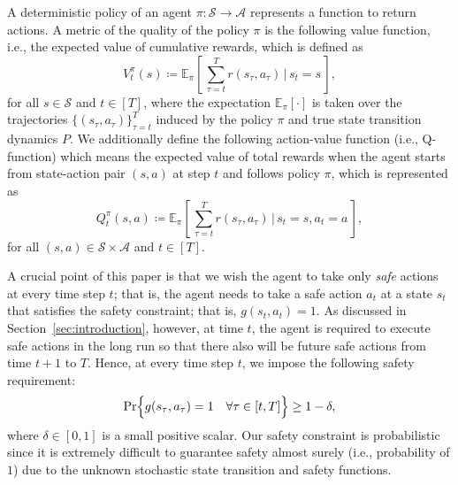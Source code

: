 \documentclass[letterpaper]{article} %
\newcommand{\E}{\mathbb{E}}
\newcommand{\cA}{\mathcal{A}}
\newcommand{\cS}{\mathcal{S}}
\newcommand{\sind}[3]{{#1}^{#2}_{#3}}
\begin{document}
A deterministic policy of an agent $\pi: \cS \rightarrow \cA$ represents a function to return actions.
A metric of the quality of the policy $\pi$ is the following value function, i.e., the expected value of cumulative rewards, which is defined as
%
\begin{equation*}
 \sind{V}{\pi}{t}(s) \coloneqq \E_{\pi} \left[\, \sum_{\tau=t}^T r(s_\tau, a_\tau)  \, \bigg | \, s_t = s \,\right],
\end{equation*}
%
for all $s \in \cS$ and $t \in [T]$,
where the expectation $\E_\pi[\cdot]$ is taken over the trajectories $\{(s_\tau, a_\tau)\}_{\tau=t}^T$ induced by the policy $\pi$ and true state transition dynamics $P$.
%
We additionally define the following action-value function (i.e., Q-function) which means the expected value of total rewards when the agent starts
from state-action pair $(s,a)$ at step $t$ and follows policy $\pi$, which is represented as
%
\begin{equation*}
    \sind{Q}{\pi}{t}(s,a) \coloneqq \E_{\pi} \left[\, \sum_{\tau=t}^T r(s_\tau, a_\tau) \, \bigg |\, s_t = s, a_t = a \,\right],
\end{equation*}
%
for all $(s,a) \in \cS\times \cA$ and $t \in [T]$.

A crucial point of this paper is that we wish the agent to take only \textit{safe} actions at every time step $t$; that is, the agent needs to take a safe action $a_t$ at a state $s_t$ that satisfies the safety constraint; that is, $g(s_t, a_t) = 1$.
As discussed in Section~\ref{sec:introduction}, however, at time $t$, the agent is required to execute safe actions in the long run so that there also will be future safe actions from time $t+1$ to $T$.
Hence, at every time step $t$, we impose the following safety requirement:
%
\begin{equation}
    \label{eq:constraint}
    \Pr \Bigl\{ g(s_\tau, a_\tau) = 1 \quad \forall \tau \in [t, T] \Big\} \ge 1 - \delta,
\end{equation}
%
where $\delta \in [0, 1]$ is a small positive scalar.
Our safety constraint is probabilistic since it is extremely difficult to guarantee safety almost surely (i.e., probability of $1$) due to the unknown stochastic state transition and safety functions.
\end{document}
